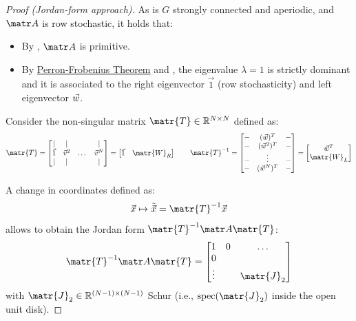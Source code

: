 \begin{subappendices}
\begin{theorem}
    \begin{proof}[Proof (Jordan-form approach)]
        As is $G$ strongly connected and aperiodic, and $\A$ is row stochastic, it holds that:
        \begin{itemize}
            \item By , $\A$ is primitive.
            \item By \hyperref[th:perron_frobenius]{Perron-Frobenius Theorem} and , the eigenvalue $\lambda=1$ is strictly dominant and it is associated to the right eigenvector $\vec{1}$ (row stochasticity) and left eigenvector ${\vec{w}}$.
        \end{itemize}
    
        Consider the non-singular matrix $\matr{T} \in \R^{N \times N}$ defined as:
        \[
            \matr{T} = \begin{bmatrix}
                \vert & \vert & & \vert \\
                \vec{1} & \v^2 & \dots & \v^N \\
                \vert & \vert & & \vert \\
            \end{bmatrix} = \begin{bmatrix}
                \vec{1} & \matr{W}_R
            \end{bmatrix}
            \qquad
            \matr{T}^{-1} = \begin{bmatrix}
                - & (\w)^T & - \\
                - & (\w^2)^T & - \\
                - & \vdots & - \\
                - & (\w^N)^T & - \\
            \end{bmatrix} = \begin{bmatrix}
                \w^T \\ \matr{W}_L
            \end{bmatrix}
        \]
    
        A change in coordinates defined as:
        \[
            \x \mapsto \tilde{\x} = \matr{T}^{-1} \x
        \]
        allows to obtain the Jordan form $\matr{T}^{-1}\A\matr{T}$:
        \[
            \matr{T}^{-1}\A\matr{T} = \begin{bmatrix}
                1 & 0 & \dots \\
                0 & & \\
                \vdots & & \matr{J}_2 \\
            \end{bmatrix}
        \]
        with $\matr{J}_2 \in \mathbb{R}^{(N-1) \times (N-1)}$ Schur (i.e., $\text{spec}(\matr{J}_2)$ inside the open unit disk).
    

\end{proof}
\end{theorem}
\end{subappendices}
